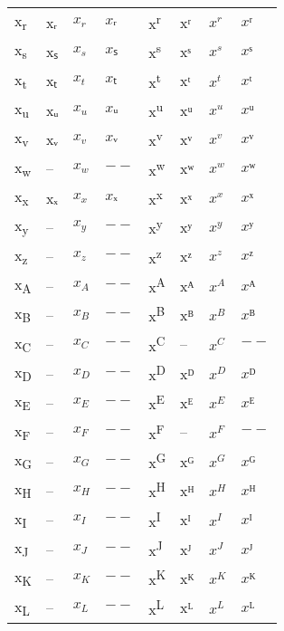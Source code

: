 \documentclass{standalone}
\begin{document}
\begin{tabular}{ll|ll|ll|ll}
x\textsubscript{r} & xᵣ & $x_{r}$ & $xᵣ$ & x\textsuperscript{r} & xʳ & $x^{r}$ & $xʳ$ \\
x\textsubscript{s} & xₛ & $x_{s}$ & $xₛ$ & x\textsuperscript{s} & xˢ & $x^{s}$ & $xˢ$ \\
x\textsubscript{t} & xₜ & $x_{t}$ & $xₜ$ & x\textsuperscript{t} & xᵗ & $x^{t}$ & $xᵗ$ \\
x\textsubscript{u} & xᵤ & $x_{u}$ & $xᵤ$ & x\textsuperscript{u} & xᵘ & $x^{u}$ & $xᵘ$ \\
x\textsubscript{v} & xᵥ & $x_{v}$ & $xᵥ$ & x\textsuperscript{v} & xᵛ & $x^{v}$ & $xᵛ$ \\
x\textsubscript{w} & -- & $x_{w}$ & $--$ & x\textsuperscript{w} & xʷ & $x^{w}$ & $xʷ$ \\
x\textsubscript{x} & xₓ & $x_{x}$ & $xₓ$ & x\textsuperscript{x} & xˣ & $x^{x}$ & $xˣ$ \\
x\textsubscript{y} & -- & $x_{y}$ & $--$ & x\textsuperscript{y} & xʸ & $x^{y}$ & $xʸ$ \\
x\textsubscript{z} & -- & $x_{z}$ & $--$ & x\textsuperscript{z} & xᶻ & $x^{z}$ & $xᶻ$ \\
\midrule
x\textsubscript{A} & -- & $x_{A}$ & $--$ & x\textsuperscript{A} & xᴬ & $x^{A}$ & $xᴬ$ \\
x\textsubscript{B} & -- & $x_{B}$ & $--$ & x\textsuperscript{B} & xᴮ & $x^{B}$ & $xᴮ$ \\
x\textsubscript{C} & -- & $x_{C}$ & $--$ & x\textsuperscript{C} & -- & $x^{C}$ & $--$ \\
x\textsubscript{D} & -- & $x_{D}$ & $--$ & x\textsuperscript{D} & xᴰ & $x^{D}$ & $xᴰ$ \\
x\textsubscript{E} & -- & $x_{E}$ & $--$ & x\textsuperscript{E} & xᴱ & $x^{E}$ & $xᴱ$ \\
x\textsubscript{F} & -- & $x_{F}$ & $--$ & x\textsuperscript{F} & -- & $x^{F}$ & $--$ \\
x\textsubscript{G} & -- & $x_{G}$ & $--$ & x\textsuperscript{G} & xᴳ & $x^{G}$ & $xᴳ$ \\
x\textsubscript{H} & -- & $x_{H}$ & $--$ & x\textsuperscript{H} & xᴴ & $x^{H}$ & $xᴴ$ \\
x\textsubscript{I} & -- & $x_{I}$ & $--$ & x\textsuperscript{I} & xᴵ & $x^{I}$ & $xᴵ$ \\
x\textsubscript{J} & -- & $x_{J}$ & $--$ & x\textsuperscript{J} & xᴶ & $x^{J}$ & $xᴶ$ \\
x\textsubscript{K} & -- & $x_{K}$ & $--$ & x\textsuperscript{K} & xᴷ & $x^{K}$ & $xᴷ$ \\
x\textsubscript{L} & -- & $x_{L}$ & $--$ & x\textsuperscript{L} & xᴸ & $x^{L}$ & $xᴸ$ \\

\end{tabular}
\end{document}
